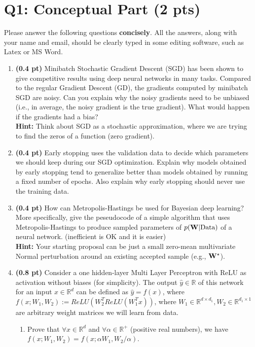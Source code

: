 \section{Q1: Conceptual Part {\bf (2 pts)}}

Please answer the following questions \textbf{concisely}. All the answers, along with your name and email, should be clearly typed in some editing software, such as Latex or MS Word.

\begin{enumerate}

\item {\bf (0.4 pt)} Minibatch Stochastic Gradient Descent (SGD) has been shown to give competitive results using deep neural networks in many tasks. Compared to the regular Gradient Descent (GD), the gradients computed by minibatch SGD are noisy. Can you explain why the noisy gradients need to be unbiased (i.e., in average, the noisy gradient is the true gradient). What would happen if the gradients had a bias?\\
{\bf Hint:} Think about SGD as a stochastic approximation, where we are trying to find the zeros of a function (zero gradient).
\vspace{4in}


\item {\bf (0.4 pt)} Early stopping uses the validation data to decide which parameters we should keep during our SGD optimization. Explain why models obtained by early stopping tend to generalize better than models obtained by running a fixed number of epochs.
Also explain why early stopping should never use the training data.
\vspace{3.5in}

\item {\bf (0.4 pt)} How can Metropolis-Hastings be used for Bayesian deep learning? More
specifically, give the peseudocode of a simple algorithm that uses
Metropolis-Hastings to produce sampled parameters of $p({\bf W}|\text{Data})$ of a neural network. (inefficient is OK and it is easier) \\
{\bf Hint:} Your starting proposal can be just a small zero-mean multivariate Normal perturbation around an existing accepted sample (e.g., ${\bf W}^\star$).
\vspace{3.5in}

\item {\bf (0.8 pt)} Consider a one hidden-layer Multi Layer Perceptron with ReLU as activation without biases (for simplicity). The output $\hat{y}\in \mathbb{R}$ of this network for an input $x \in \mathbb{R}^d$ can be defined as $\hat{y} = f(x)$, where $f(x; W_1,W_2) := ReLU(W_2^T  ReLU( W_1^T x))$, where $W_1\in \mathbb{R}^{d\times d_1},W_2\in \mathbb{R}^{d_1\times 1}$ are arbitrary weight matrices we will learn from data.
\begin{enumerate}
    \item Prove that $\forall x \in \mathbb{R}^d$ and $\forall \alpha \in \mathbb{R}^+$ (positive real numbers), we have $f(x; W_1,W_2) = f(x; \alpha W_1,W_2/\alpha)$.
    \vspace{1.5in}


\end{enumerate}
\end{enumerate}
